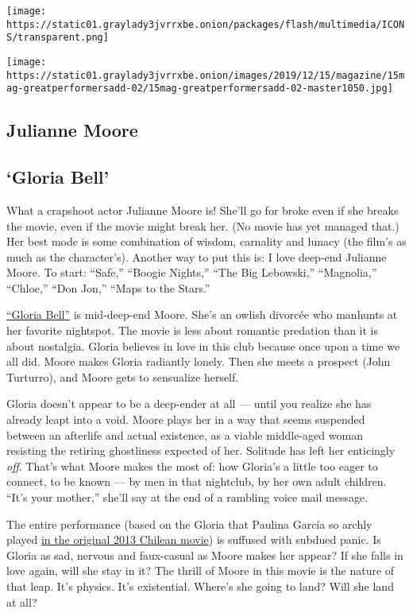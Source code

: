 \texttt{[image: https://static01.graylady3jvrrxbe.onion/packages/flash/multimedia/ICONS/transparent.png]}

\texttt{[image: https://static01.graylady3jvrrxbe.onion/images/2019/12/15/magazine/15mag-greatperformersadd-02/15mag-greatperformersadd-02-master1050.jpg]}

\hypertarget{julianne-moore}{%
\subsection{Julianne Moore}\label{julianne-moore}}

\hypertarget{gloria-bell}{%
\subsection{`Gloria Bell'}\label{gloria-bell}}

What a crapshoot actor Julianne Moore is! She'll go for broke even if
she breaks the movie, even if the movie might break her. (No movie has
yet managed that.) Her best mode is some combination of wisdom,
carnality and lunacy (the film's as much as the character's). Another
way to put this is: I love deep-end Julianne Moore. To start: ``Safe,''
``Boogie Nights,'' ``The Big Lebowski,'' ``Magnolia,'' ``Chloe,'' ``Don
Jon,'' ``Maps to the Stars.''

\href{https://www.nytimes3xbfgragh.onion/2019/03/07/movies/gloria-bell-review.html}{``Gloria
Bell''} is mid-deep-end Moore. She's an owlish divorcée who manhunts at
her favorite nightspot. The movie is less about romantic predation than
it is about nostalgia. Gloria believes in love in this club because once
upon a time we all did. Moore makes Gloria radiantly lonely. Then she
meets a prospect (John Turturro), and Moore gets to sensualize herself.

Gloria doesn't appear to be a deep-ender at all --- until you realize
she has already leapt into a void. Moore plays her in a way that seems
suspended between an afterlife and actual existence, as a viable
middle-aged woman resisting the retiring ghostliness expected of her.
Solitude has left her enticingly \emph{off}. That's what Moore makes the
most of: how Gloria's a little too eager to connect, to be known --- by
men in that nightclub, by her own adult children. ``It's your mother,''
she'll say at the end of a rambling voice mail message.

The entire performance (based on the Gloria that Paulina García so
archly played
\href{https://www.nytimes3xbfgragh.onion/2014/01/24/movies/in-gloria-a-chilean-in-her-late-50s-embraces-passion.html}{in
the original 2013 Chilean movie}) is suffused with subdued panic. Is
Gloria as sad, nervous and faux-casual as Moore makes her appear? If she
falls in love again, will she stay in it? The thrill of Moore in this
movie is the nature of that leap. It's physics. It's existential.
Where's she going to land? Will she land at all?

